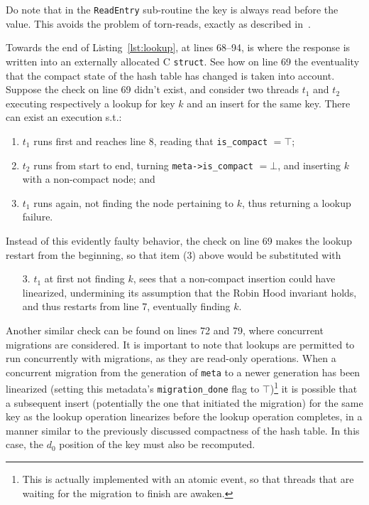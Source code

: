 Do note that in the \texttt{ReadEntry} sub-routine the key is always read before the value.
This avoids the problem of torn-reads, exactly as described in~\cite[\S4, Lookup]{maier}.

Towards the end of Listing~\ref{lst:lookup}, at lines 68--94, is where the response is written into an externally allocated C \texttt{struct}.
See how on line 69 the eventuality that the compact state of the hash table has changed is taken into account.
Suppose the check on line 69 didn't exist, and consider two threads $t_1$ and $t_2$ executing respectively a lookup for key $k$ and an insert for the same key.
There can exist an execution s.t.:
\begin{enumerate}
	\item $t_1$ runs first and reaches line 8, reading that \texttt{is\_compact} $= \top$;
	\item $t_2$ runs from start to end, turning \texttt{{meta->is\_compact}} $= \bot$, and inserting $k$ with a non-compact node; and
	\item $t_1$ runs again, not finding the node pertaining to $k$, thus returning a lookup failure.
\end{enumerate}

Instead of this evidently faulty behavior, the check on line 69 makes the lookup restart from the beginning, so that item (3) above would be substituted with
\begin{enumerate}
	\item[3.] $t_1$ at first not finding $k$, sees that a non-compact insertion could have linearized, undermining its assumption that the Robin Hood invariant holds, and thus restarts from line 7, eventually finding $k$.
\end{enumerate}

Another similar check can be found on lines 72 and 79, where concurrent migrations are considered.
It is important to note that lookups are permitted to run concurrently with migrations, as they are read-only operations.
When a concurrent migration from the generation of \texttt{meta} to a newer generation has been linearized (setting this metadata's \texttt{{migration\_done}} flag to $\top$)\footnote{%
	This is actually implemented with an atomic event, so that threads that are waiting for the migration to finish are awaken.
} it is possible that a subsequent insert (potentially the one that initiated the migration) for the same key as the lookup operation linearizes before the lookup operation completes, in a manner similar to the previously discussed compactness of the hash table.
In this case, the $d_0$ position of the key must also be recomputed.


